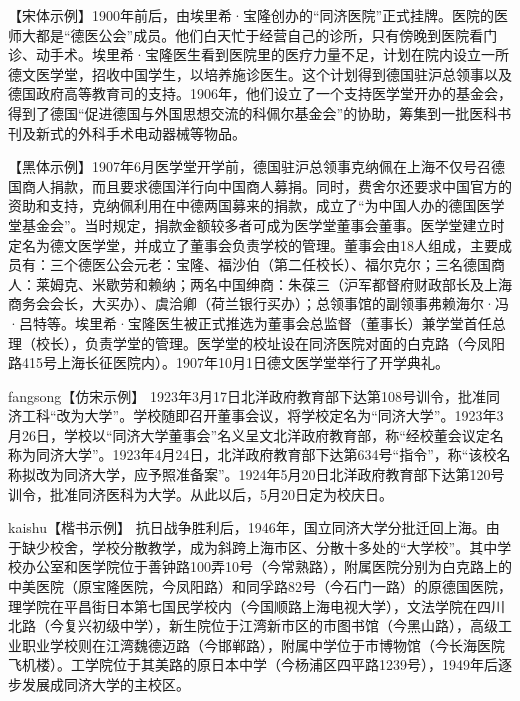 {\songti

【宋体示例】1900年前后，由埃里希·宝隆创办的“同济医院”正式挂牌。医院的医师大都是“德医公会”成员。他们白天忙于经营自己的诊所，只有傍晚到医院看门诊、动手术。埃里希·宝隆医生看到医院里的医疗力量不足，计划在院内设立一所德文医学堂，招收中国学生，以培养施诊医生。这个计划得到德国驻沪总领事以及德国政府高等教育司的支持。1906年，他们设立了一个支持医学堂开办的基金会，得到了德国“促进德国与外国思想交流的科佩尔基金会”的协助，筹集到一批医科书刊及新式的外科手术电动器械等物品。}

{\heiti 【黑体示例】1907年6月医学堂开学前，德国驻沪总领事克纳佩在上海不仅号召德国商人捐款，而且要求德国洋行向中国商人募捐。同时，费舍尔还要求中国官方的资助和支持，克纳佩利用在中德两国募来的捐款，成立了“为中国人办的德国医学堂基金会”。当时规定，捐款金额较多者可成为医学堂董事会董事。医学堂建立时定名为德文医学堂，并成立了董事会负责学校的管理。董事会由18人组成，主要成员有：三个德医公会元老：宝隆、福沙伯（第二任校长）、福尔克尔；三名德国商人：莱姆克、米歇劳和赖纳；两名中国绅商：朱葆三（沪军都督府财政部长及上海商务会会长，大买办）、虞洽卿（荷兰银行买办）；总领事馆的副领事弗赖海尔·冯·吕特等。埃里希·宝隆医生被正式推选为董事会总监督（董事长）兼学堂首任总理（校长），负责学堂的管理。医学堂的校址设在同济医院对面的白克路（今凤阳路415号上海长征医院内）。1907年10月1日德文医学堂举行了开学典礼。}

{\ifcsname fangsong\endcsname\fangsong【仿宋示例】\else[无 \cs{fangsong} 字体。]\fi
1923年3月17日北洋政府教育部下达第108号训令，批准同济工科“改为大学”。学校随即召开董事会议，将学校定名为“同济大学”。1923年3月26日，学校以“同济大学董事会”名义呈文北洋政府教育部，称“经校董会议定名称为同济大学”。1923年4月24日，北洋政府教育部下达第634号“指令”，称“该校名称拟改为同济大学，应予照准备案”。1924年5月20日北洋政府教育部下达第120号训令，批准同济医科为大学。从此以后，5月20日定为校庆日。}

{\ifcsname kaishu\endcsname\kaishu【楷书示例】\else[无 \cs{kaishu} 字体。]\fi
抗日战争胜利后，1946年，国立同济大学分批迁回上海。由于缺少校舍，学校分散教学，成为斜跨上海市区、分散十多处的“大学校”。其中学校办公室和医学院位于善钟路100弄10号（今常熟路），附属医院分别为白克路上的中美医院（原宝隆医院，今凤阳路）和同孚路82号（今石门一路）的原德国医院，理学院在平昌街日本第七国民学校内（今国顺路上海电视大学），文法学院在四川北路（今复兴初级中学），新生院位于江湾新市区的市图书馆（今黑山路），高级工业职业学校则在江湾魏德迈路（今邯郸路），附属中学位于市博物馆（今长海医院飞机楼）。工学院位于其美路的原日本中学（今杨浦区四平路1239号），1949年后逐步发展成同济大学的主校区。}

